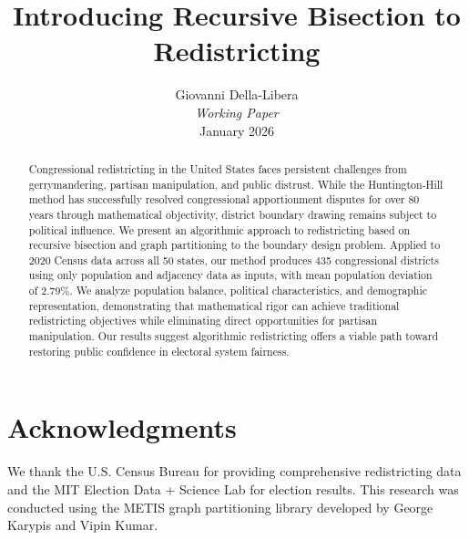 \documentclass[11pt,twocolumn]{article}
\title{\textbf{Introducing Recursive Bisection to Redistricting}}
\author{
Giovanni Della-Libera\\
\textit{Working Paper}\\
January 2026
}
\date{}
\begin{document}
\maketitle

\begin{abstract}
Congressional redistricting in the United States faces persistent challenges from gerrymandering, partisan manipulation, and public distrust. While the Huntington-Hill method has successfully resolved congressional apportionment disputes for over 80 years through mathematical objectivity, district boundary drawing remains subject to political influence. We present an algorithmic approach to redistricting based on recursive bisection and graph partitioning to the boundary design problem. Applied to 2020 Census data across all 50 states, our method produces 435 congressional districts using only population and adjacency data as inputs, with mean population deviation of 2.79\%. We analyze population balance, political characteristics, and demographic representation, demonstrating that mathematical rigor can achieve traditional redistricting objectives while eliminating direct opportunities for partisan manipulation. Our results suggest algorithmic redistricting offers a viable path toward restoring public confidence in electoral system fairness.
\end{abstract}








\section*{Acknowledgments}
We thank the U.S. Census Bureau for providing comprehensive redistricting data and the MIT Election Data + Science Lab for election results. This research was conducted using the METIS graph partitioning library developed by George Karypis and Vipin Kumar.



\end{document}
